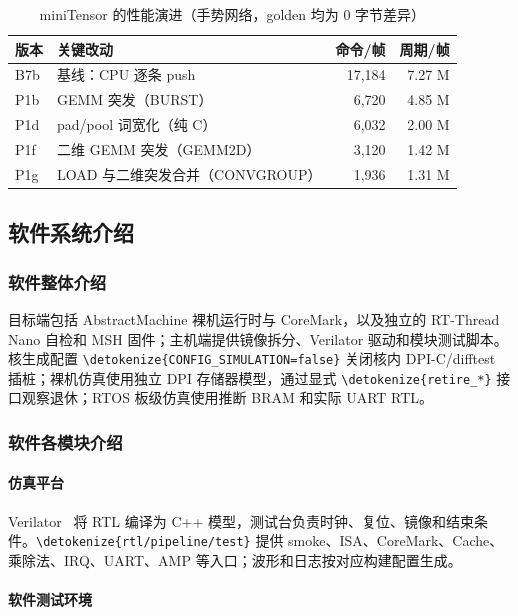 \documentclass[UTF8,a4paper,12pt,fontset=none,scheme=plain]{ctexart}
\newcommand{\code}[1]{\texttt{\detokenize{#1}}}
\newenvironment{tighttable}{\begingroup\setstretch{1}\fontsize{9}{12}\selectfont\setlength{\tabcolsep}{2pt}}{\endgroup}
\renewcommand{\code}[1]{{\small\ttfamily\urlstyle{tt}\expandafter\nolinkurl\expandafter{\detokenize{#1}}}}
\begin{document}
\begin{table}[H]
\centering
\caption{miniTensor 的性能演进（手势网络，golden 均为 0 字节差异）}
\label{tab:mt-perf}
\begin{tighttable}
\begin{tabularx}{\linewidth}{@{}P{1.6cm}P{5.6cm}rr@{}}
\toprule
版本 & 关键改动 & 命令/帧 & 周期/帧 \\
\midrule
B7b & 基线：CPU 逐条 push & 17,184 & 7.27 M \\
P1b & GEMM 突发（BURST） & 6,720 & 4.85 M \\
P1d & pad/pool 词宽化（纯 C） & 6,032 & 2.00 M \\
P1f & 二维 GEMM 突发（GEMM2D） & 3,120 & 1.42 M \\
P1g & LOAD 与二维突发合并（CONVGROUP） & 1,936 & 1.31 M \\
\bottomrule
\end{tabularx}
\end{tighttable}
\end{table}



\subsection{软件系统介绍}
\subsubsection{软件整体介绍}
目标端包括 AbstractMachine 裸机运行时与 CoreMark，以及独立的 RT-Thread Nano 自检和 MSH 固件；主机端提供镜像拆分、Verilator 驱动和模块测试脚本。
核生成配置 \code{CONFIG_SIMULATION=false} 关闭核内 DPI-C/difftest 插桩；裸机仿真使用独立 DPI 存储器模型，通过显式 \code{retire_*} 接口观察退休；RTOS 板级仿真使用推断 BRAM 和实际 UART RTL。

\subsubsection{软件各模块介绍}
\paragraph{仿真平台}

Verilator~\cite{verilator} 将 RTL 编译为 C++ 模型，测试台负责时钟、复位、镜像和结束条件。\code{rtl/pipeline/test} 提供 smoke、ISA、CoreMark、Cache、乘除法、IRQ、UART、AMP 等入口；波形和日志按对应构建配置生成。

\paragraph{软件测试环境}
\end{document}
